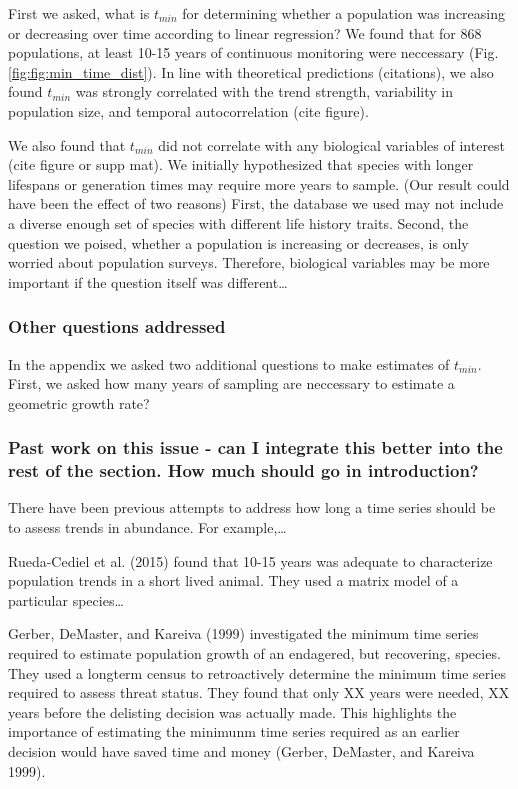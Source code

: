 \documentclass[12pt,]{article}
\begin{document}
First we asked, what is \(t_{min}\) for determining whether a population
was increasing or decreasing over time according to linear regression?
We found that for 868 populations, at least 10-15 years of continuous
monitoring were neccessary (Fig. \ref{fig:fig:min_time_dist}). In line
with theoretical predictions (citations), we also found \(t_{min}\) was
strongly correlated with the trend strength, variability in population
size, and temporal autocorrelation (cite figure).

We also found that \(t_{min}\) did not correlate with any biological
variables of interest (cite figure or supp mat). We initially
hypothesized that species with longer lifespans or generation times may
require more years to sample. (Our result could have been the effect of
two reasons) First, the database we used may not include a diverse
enough set of species with different life history traits. Second, the
question we poised, whether a population is increasing or decreases, is
only worried about population surveys. Therefore, biological variables
may be more important if the question itself was different\ldots{}

\subsubsection{Other questions
addressed}\label{other-questions-addressed}

In the appendix we asked two additional questions to make estimates of
\(t_{min}\). First, we asked how many years of sampling are neccessary
to estimate a geometric growth rate?

\subsubsection{Past work on this issue - can I integrate this better
into the rest of the section. How much should go in
introduction?}\label{past-work-on-this-issue---can-i-integrate-this-better-into-the-rest-of-the-section.-how-much-should-go-in-introduction}

There have been previous attempts to address how long a time series
should be to assess trends in abundance. For example,\ldots{}

Rueda-Cediel et al. (2015) found that 10-15 years was adequate to
characterize population trends in a short lived animal. They used a
matrix model of a particular species\ldots{}

Gerber, DeMaster, and Kareiva (1999) investigated the minimum time
series required to estimate population growth of an endagered, but
recovering, species. They used a longterm census to retroactively
determine the minimum time series required to assess threat status. They
found that only XX years were needed, XX years before the delisting
decision was actually made. This highlights the importance of estimating
the minimunm time series required as an earlier decision would have
saved time and money (Gerber, DeMaster, and Kareiva 1999).
\end{document}
